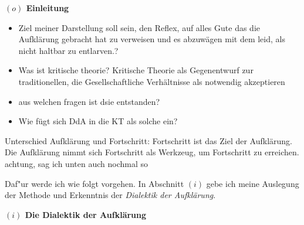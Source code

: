 \documentclass[a4paper, 12pt]{article}
\begin{document}
\begin{onehalfspace} 

\noindent\textbf{$(o)$ Einleitung}

\noindent %

\begin{itemize}

\item Ziel meiner Darstellung soll sein, den Reflex, auf alles Gute das die Aufklärung gebracht hat zu verweisen und es abzuwägen mit dem leid, als nicht haltbar zu entlarven.?
   \item Was ist kritische theorie? Kritische Theorie als Gegenentwurf zur traditionellen, die Gesellschaftliche Verhältnisse als notwendig akzeptieren
  \item aus welchen fragen ist dsie entstanden?
  \item Wie fügt sich DdA in die KT als solche ein?
\end{itemize}

Unterschied Aufklärung und Fortschritt: Fortschritt ist das Ziel der Aufklärung. Die Aufklärung nimmt sich Fortschritt als Werkzeug, um Fortschritt zu erreichen. achtung, sag ich unten auch nochmal so


Daf"ur werde ich wie folgt vorgehen. In Abschnitt $(i)$ gebe ich meine Auslegung der Methode und Erkenntnis der \emph{Dialektik der Aufklärung}. 

\vspace{5mm}


\noindent\textbf{$(i)$ Die Dialektik der Aufklärung}


\end{onehalfspace}
\end{document}
